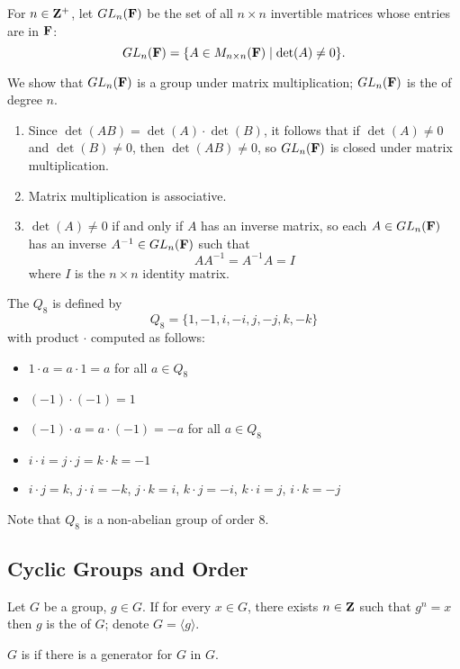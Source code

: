 \begin{example}
For $n\in\mathbf Z^+$, let $GL_n(\mathbf F)$ be the set of all $n\times n$ invertible matrices whose entries are in $\mathbf F$:
\[GL_n(\mathbf F)=\{A\in M_{n\times n}(\mathbf F)\mid\det(A)\neq0\}.\]

We show that $GL_n(\mathbf F)$ is a group under matrix multiplication; $GL_n(\mathbf F)$ is the  of degree $n$.
\begin{enumerate}[label=(\roman*)]
\item Since $\det(AB)=\det(A)\cdot\det(B)$, it follows that if $\det(A)\neq0$ and $\det(B)\neq0$, then $\det(AB)\neq0$, so $GL_n(\mathbf F)$ is closed under matrix multiplication.
\item Matrix multiplication is associative.
\item $\det(A)\neq0$ if and only if $A$ has an inverse matrix, so each $A\in GL_n(\mathbf F)$ has an inverse $A^{-1}\in GL_n(\mathbf F)$ such that
\[AA^{-1}=A^{-1}A=I\]
where $I$ is the $n\times n$ identity matrix.
\end{enumerate}
\end{example}

\begin{example}
The  $Q_8$ is defined by
\[Q_8=\{1,-1,i,-i,j,-j,k,-k\}\]
with product $\cdot$ computed as follows:
\begin{itemize}
\item $1\cdot a=a\cdot 1=a$ for all $a\in Q_8$
\item $(-1)\cdot(-1)=1$
\item $(-1)\cdot a=a\cdot(-1)=-a$ for all $a\in Q_8$
\item $i\cdot i=j\cdot j=k\cdot k=-1$
\item $i\cdot j=k$, $j\cdot i=-k$, $j\cdot k=i$, $k\cdot j=-i$, $k\cdot i=j$, $i\cdot k=-j$
\end{itemize}
Note that $Q_8$ is a non-abelian group of order $8$.
\end{example}

\subsection{Cyclic Groups and Order}
\begin{definition}
Let $G$ be a group, $g\in G$. If for every $x\in G$, there exists $n\in\mathbf Z$ such that $g^n=x$ then $g$ is the  of $G$; denote $G=\langle g\rangle$.

$G$ is  if there is a generator for $G$ in $G$.
\end{definition}

